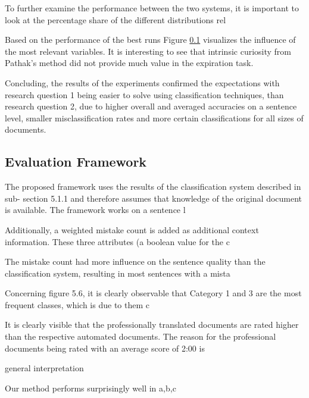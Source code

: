         
        To further examine the performance between the two systems, it is important to look at
        the percentage share of the different distributions rel
        
        Based on the performance of the best runs Figure \ref{} visualizes the influence of the most relevant variables.
        It is interesting to see that intrinsic curiosity from Pathak's method \cite{pathak2017curiosity} did not provide much value in the expiration task.
        
        
        Concluding, the results of the experiments conﬁrmed the expectations with research question
        1 being easier to solve using classiﬁcation techniques, than research question 2, due
        to higher overall and averaged accuracies on a sentence level, smaller misclassiﬁcation
        rates and more certain classiﬁcations for all sizes of documents.


    \subsection{Evaluation Framework}

        The proposed framework uses the results of the classiﬁcation system described in sub-
        section 5.1.1 and therefore assumes that knowledge of the original document is available.
        The framework works on a sentence l
        
        
        
        Additionally, a weighted mistake count is added as additional context information. These
        three attributes (a boolean value for the c
        
        
        The mistake count had more inﬂuence on the sentence quality than the classiﬁcation system,
        resulting in most sentences with a mista
        
        
        Concerning ﬁgure 5.6, it is clearly observable that Category 1 and 3 are the most frequent
        classes, which is due to them c
        
        
        It is clearly visible that the professionally translated documents are rated higher than the
        respective automated documents. The reason for the professional documents being rated
        with an average score of 2:00 is 
        
        general interpretation

        Our method performs surprisingly well in a,b,c
        
